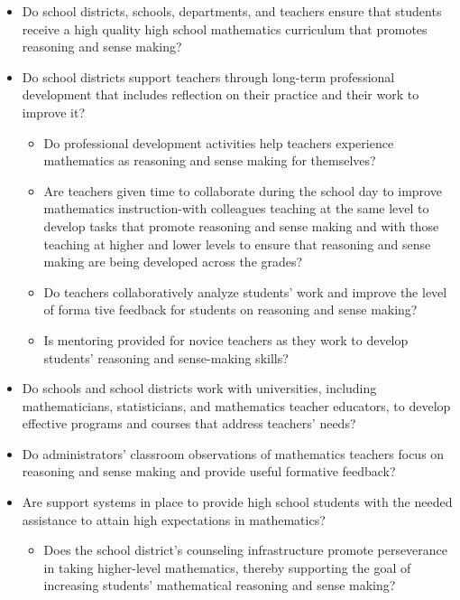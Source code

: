 \documentclass[
  10pt,
  a4paper,
  landscape,
  twoside,
  openany
]{scrbook}
\newcommand{\EN}[1]{#1}
\begin{document}
\TriPara
{
\EN{
  \begin{itemize}
    \item Do school districts, schools, departments, and teachers ensure that students receive a high quality high school mathematics curriculum that promotes reasoning and sense making?
    \item Do school districts support teachers through long-term professional development that includes reflection on their practice and their work to improve it?
      \begin{itemize}
        \item Do professional development activities help teachers experience mathematics as reasoning and sense making for themselves?
        \item Are teachers given time to collaborate during the school day to improve mathematics instruction-with colleagues teaching at the same level to develop tasks that promote reasoning and sense making and with those teaching at higher and lower levels to ensure that reasoning and sense making are being developed across the grades?
        \item Do teachers collaboratively analyze students' work and improve the level of forma  tive feedback for students on reasoning and sense making?
        \item Is mentoring provided for novice teachers as they work to develop students' reasoning and sense-making skills?
      \end{itemize}
    \item Do schools and school districts work with universities, including mathematicians, statisticians, and mathematics teacher educators, to develop effective programs and courses that address teachers' needs?
    \item Do administrators' classroom observations of mathematics teachers focus on reasoning and sense making and provide useful formative feedback?
    \item Are support systems in place to provide high school students with the needed assistance to attain high expectations in mathematics?
      \begin{itemize}
        \item Does the school district's counseling infrastructure promote perseverance in taking higher-level mathematics, thereby supporting the goal of increasing students' mathematical reasoning and sense making?
      \end{itemize}
  \end{itemize}}
}
\end{document}
